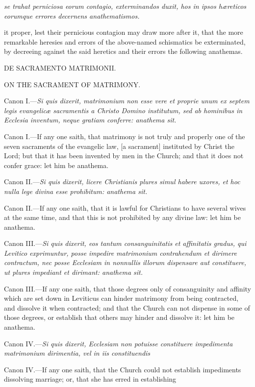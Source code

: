 \emph{se trahat perniciosa eorum contagio, exterminandos duxit, hos in ipsos hæreticos eorumque errores decernens anathematismos.}

it proper, lest their pernicious contagion may draw more after it, that the more remarkable heresies and errors of the above-named schismatics be exterminated, by decreeing against the said heretics and their errors the following anathemas.

DE SACRAMENTO MATRIMONII.

ON THE SACRAMENT OF MATRIMONY.

Canon I.—\emph{Si quis dixerit, matrimonium non esse vere et proprie unum ex septem legis evangelicæ sacramentis a Christo Domino institutum, sed ab hominibus in Ecclesia inventum, neque gratiam conferre: anathema sit.}

Canon I.—If any one saith, that matrimony is not truly and properly one of the seven sacraments of the evangelic law, [a sacrament] instituted by Christ the Lord; but that it has been invented by men in the Church; and that it does not confer grace: let him be anathema.

Canon II.—\emph{Si quis dixerit, licere Christianis plures simul habere uxores, et hoc nulla lege divina esse prohibitum: anathema sit.}

Canon II.—If any one saith, that it is lawful for Christians to have several wives at the same time, and that this is not prohibited by any divine law: let him be anathema.

Canon III.—\emph{Si quis dixerit, eos tantum consanguinitatis et affinitatis gradus, qui Levitico exprimuntur, posse impedire matrimonium contrahendum et dirimere contractum, nec posse Ecclesiam in nonnullis illorum dispensare aut constituere, ut plures impediant et dirimant: anathema sit.}

Canon III.—If any one saith, that those degrees only of consanguinity and affinity which are set down in Leviticus can hinder matrimony from being contracted, and dissolve it when contracted; and that the Church can not dispense in some of those degrees, or establish that others may hinder and dissolve it: let him be anathema.

Canon IV.—\emph{Si quis dixerit, Ecclesiam non potuisse constituere impedimenta matrimonium dirimentia, vel in iis constituendis }

Canon IV.—If any one saith, that the Church could not establish impediments dissolving marriage; or, that she has erred in establishing

